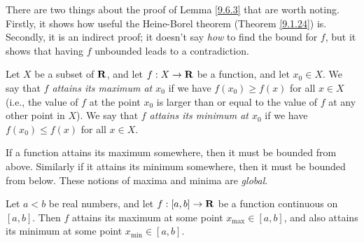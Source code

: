 \begin{remark}\label{9.6.4}
    There are two things about the proof of Lemma \ref{9.6.3} that are worth noting.
    Firstly, it shows how useful the Heine-Borel theorem (Theorem \ref{9.1.24}) is.
    Secondly, it is an indirect proof;
    it doesn't say \emph{how} to find the bound for \(f\), but it shows that having \(f\) unbounded leads to a contradiction.
\end{remark}

\begin{definition}\label{9.6.5}
    Let \(X\) be a subset of \(\mathbf{R}\), and let \(f : X \to \mathbf{R}\) be a function, and let \(x_0 \in X\).
    We say that \emph{\(f\) attains its maximum at \(x_0\)} if we have \(f(x_0) \geq f(x)\) for all \(x \in X\)
    (i.e., the value of \(f\) at the point \(x_0\) is larger than or equal to the value of \(f\) at any other point in \(X\)).
    We say that \emph{\(f\) attains its minimum at \(x_0\)} if we have \(f(x_0) \leq f(x)\) for all \(x \in X\).
\end{definition}

\begin{remark}\label{9.6.6}
    If a function attains its maximum somewhere, then it must be bounded from above.
    Similarly if it attains its minimum somewhere, then it must be bounded from below.
    These notions of maxima and minima are \emph{global}.
\end{remark}

\begin{proposition}\label{9.6.7}
    Let \(a < b\) be real numbers, and let \(f : [a, b] \to \mathbf{R}\) be a function continuous on \([a, b]\).
    Then \(f\) attains its maximum at some point \(x_{\max} \in [a, b]\), and also attains its minimum at some point \(x_{\min} \in [a, b]\).
\end{proposition}

